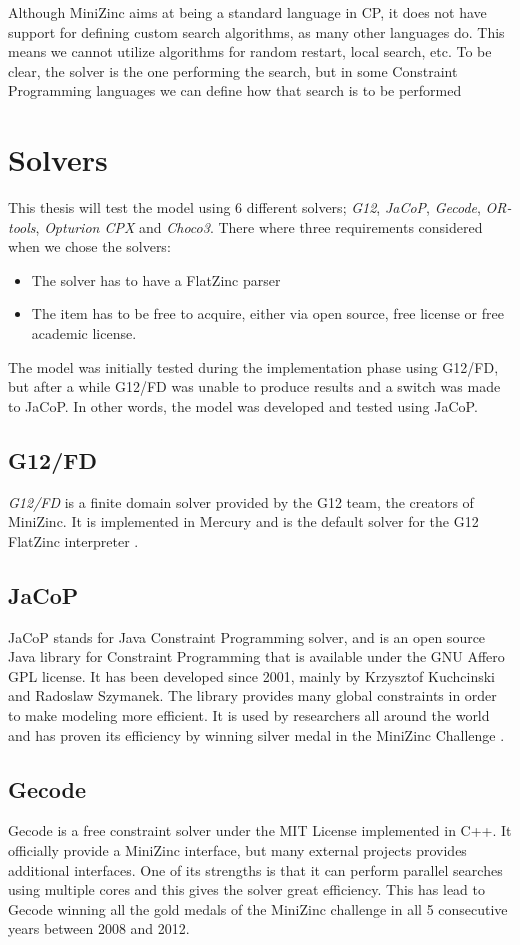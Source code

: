Although MiniZinc aims at being a standard language in CP, it does not have support for defining custom search algorithms, as many other languages do. This means we cannot utilize algorithms for random restart, local search, etc. To be clear, the solver is the one performing the search, but in some Constraint Programming languages we can define how that search is to be performed
\cite{mz_paper}

\section{Solvers}
This thesis will test the model using 6 different solvers; \emph{G12}, \emph{JaCoP}, \emph{Gecode}, \emph{OR-tools}, \emph{Opturion CPX} and \emph{Choco3}. There where three requirements considered when we chose the solvers:
\begin{itemize}
\item The solver has to have a FlatZinc parser
\item The item has to be free to acquire, either via open source, free license or free academic license.
\end{itemize}

The model was initially tested during the implementation phase using G12/FD, but after a while G12/FD was unable to produce results and a switch was made to JaCoP. In other words, the model was developed and tested using JaCoP.

\subsection{G12/FD}
\emph{G12/FD} is a finite domain solver provided by the G12 team, the creators of MiniZinc. It is implemented in Mercury and is the default solver for the G12 FlatZinc interpreter \cite{nicta_2964} \cite{mz_result_2014}.
\subsection{JaCoP}
JaCoP stands for Java Constraint Programming solver, and is an open source Java library for Constraint Programming that is available under the GNU Affero GPL license. It has been developed since 2001, mainly by Krzysztof Kuchcinski and Radoslaw Szymanek. The library provides many global constraints in order to make modeling more efficient. It is used by researchers all around the world and has proven its efficiency by winning silver medal in the MiniZinc Challenge
\cite{jacop_overview}
\cite{jacop_about}.
\subsection{Gecode}
Gecode is a free constraint solver under the MIT License implemented in C++. It officially provide a MiniZinc interface, but many external projects provides additional interfaces. One of its strengths is that it can perform parallel searches using multiple cores and this gives the solver great efficiency. This has lead to Gecode winning all the gold medals of the MiniZinc challenge in all 5 consecutive years between 2008 and 2012.
\cite{gecode}
